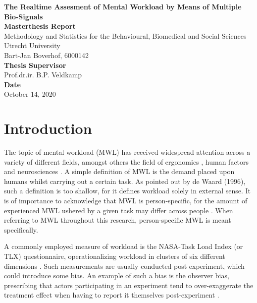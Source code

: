 \documentclass{article}
\begin{document}
\begin{titlepage}
\begin{center}
\LARGE{\textbf{The Realtime Assesment of Mental Workload by Means of Multiple Bio-Signals}}\\
\vspace*{2\baselineskip}
\Large{\textbf{Masterthesis Report}}\\
Methodology and Statistics for the Behavioural, Biomedical and Social Sciences\\
\vspace*{1\baselineskip}
Utrecht University\\
\vspace*{4\baselineskip}
{Bart-Jan Boverhof, 6000142}\\
\vspace*{1\baselineskip}
{\textbf{Thesis Supervisor}}\\
Prof.dr.ir. B.P. Veldkamp\\
\vspace*{1\baselineskip}
{\textbf{Date}}\\
October 14, 2020\\
\vspace*{1\baselineskip}
\end{center}
\end{titlepage}

\section{Introduction} \label{Introduction}
The topic of mental workload (MWL) has received widespread attention across a variety of different fields, amongst others the field of ergonomics \cite{young2015state}, human factors \cite{pretorius2007development} and neurosciences \cite{shuggi2017mental}.
A simple definition of MWL is the demand placed upon humans whilst carrying out a certain task. As pointed out by de Waard (1996), such a definition is too shallow, for it defines workload solely in external sense. It is of importance to acknowledge that MWL is person-specific, for the amount of experienced MWL ushered by a given task may differ across people \cite{de1996measurement}. When referring to MWL throughout this research, person-specific MWL is meant specifically.

A commonly employed measure of workload is the NASA-Task Load Index (or TLX) questionnaire, operationalizing workload in clusters of six different dimensions \cite{hart2006nasa}. Such measurements are usually conducted post experiment, which could introduce some bias. An example of such a bias is the observer bias, prescribing that actors participating in an experiment tend to over-exaggerate the treatment effect when having to report it themselves post-experiment \cite{mahtani2018catalogue}.
\end{document}
